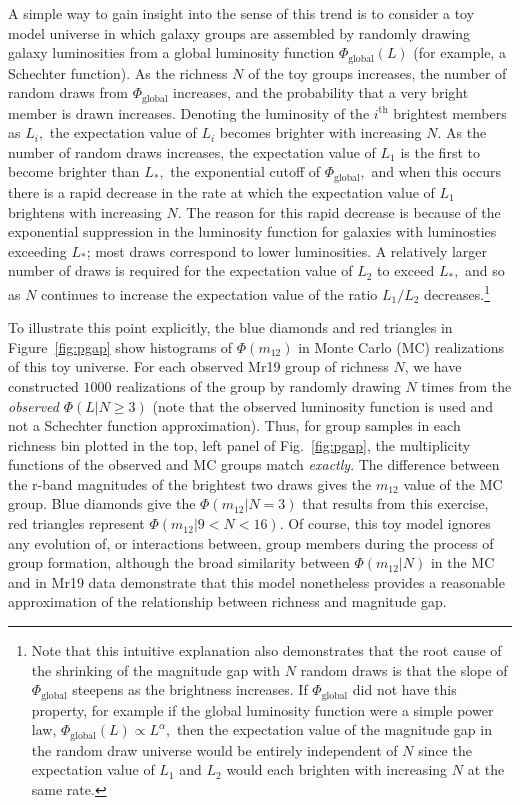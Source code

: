\documentclass[usenatbib,usegraphicx,letterpaper]{mn2e}
\newcommand{\monetwo}{m_{12}}
\newcommand{\phiglo}{\Phi_{\mathrm{global}}}
\newcommand{\ith}{i^{\mathrm{th}}}
\begin{document}
A simple way to gain insight into the sense of this trend is 
to consider a toy model universe in which galaxy groups are 
assembled by randomly drawing galaxy luminosities from a global 
luminosity function $\phiglo(L)$ (for example, a Schechter function).  As the richness $N$ of the toy groups 
increases, the number of random draws from $\phiglo$ increases, and the probability 
that a very bright member is drawn increases. Denoting the luminosity of the $\ith$ brightest 
members as $L_i,$ the expectation value of $L_i$ becomes brighter with increasing $N.$ As the 
number of random draws increases, the expectation value of $L_1$ is the first to become brighter 
than $L_*,$ the exponential cutoff of $\phiglo,$ and when this occurs there is a rapid decrease 
in the rate at which the expectation value of $L_1$ brightens with increasing $N.$  The 
reason for this rapid decrease is because of the exponential suppression in the luminosity 
function for galaxies with luminosties exceeding $L_*$; most draws correspond to lower luminosities.  
A relatively larger number of draws is required for the expectation value of $L_2$ 
to exceed $L_*,$ and so as $N$ continues to increase the expectation value of the 
ratio $L_1/L_2$ decreases.\footnote{Note that this intuitive explanation also 
demonstrates that the root cause of the shrinking of the magnitude gap with $N$ 
random draws is that the slope of $\phiglo$ steepens as the brightness increases. 
If $\phiglo$ did not have this property, for example if the global luminosity function 
were a simple power law, $\phiglo(L)\propto L^{\alpha},$ then the expectation 
value of the magnitude gap in the random draw universe would be entirely independent 
of $N$ since the expectation value of $L_1$ and $L_2$ would each brighten with 
increasing $N$ at the same rate.}


To illustrate this point explicitly, the blue diamonds and red triangles 
in Figure~\ref{fig:pgap} show histograms of $\Phi(\monetwo)$ in Monte Carlo (MC) 
realizations of this toy universe. For each observed Mr19 group of richness $N$, 
we have constructed $1000$ realizations of the group by randomly drawing $N$ times 
from the {\em observed} $\Phi(L|N\geq3)$ (note that the observed luminosity function 
is used and not a Schechter function approximation). 
Thus, for group samples in each richness bin plotted in the top, 
left panel of Fig.~\ref{fig:pgap}, the multiplicity functions of the observed 
and MC groups match {\em exactly}. The difference between the r-band magnitudes 
of the brightest two draws gives the $\monetwo$ value of the MC group. 
Blue diamonds give the $\Phi(\monetwo|N=3)$ that results from this 
exercise, red triangles represent $\Phi(\monetwo|9<N<16).$ 
Of course, this toy model ignores any evolution of, or interactions between, 
group members during the process of group formation, although the broad similarity 
between $\Phi(\monetwo|N)$ in the MC and in Mr19 data demonstrate 
that this model nonetheless provides a reasonable approximation of the relationship 
between richness and magnitude gap.
\end{document}
